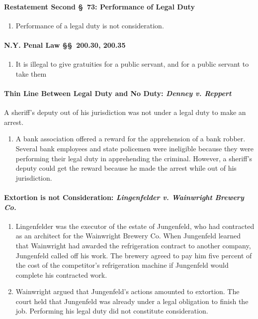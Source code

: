 \paragraph{Restatement Second \S\ 73: Performance of Legal Duty}

\begin{enumerate}
    \item Performance of a legal duty is not consideration.
\end{enumerate}

\paragraph{N.Y. Penal Law \S\S\ 200.30, 200.35}

\begin{enumerate}
    \item It is illegal to give gratuities for a public servant, and for a 
    public servant to take them
\end{enumerate}

\paragraph{Thin Line Between Legal Duty and No Duty: \emph{Denney v. Reppert}}

A sheriff's deputy out of his jurisdiction was not under a legal duty to make 
an arrest.

\begin{enumerate}
    \item A bank association offered a reward for the apprehension of a bank 
    robber. Several bank employees and state policemen were ineligible because 
    they were performing their legal duty in apprehending the criminal. 
    However, a sheriff's deputy could get the reward because he made the 
    arrest while out of his jurisdiction.
\end{enumerate}

\paragraph{Extortion is not Consideration: \emph{Lingenfelder v. Wainwright 
Brewery Co.}}

\begin{enumerate}
    \item Lingenfelder was the executor of the estate of Jungenfeld, who had 
    contracted as an architect for the Wainwright Brewery Co. When Jungenfeld 
    learned that Wainwright had awarded the refrigeration contract to another 
    company, Jungenfeld called off his work. The brewery agreed to pay him 
    five percent of the cost of the competitor's refrigeration machine if 
    Jungenfeld would complete his contracted work.
    \item Wainwright argued that Jungenfeld's actions amounted to extortion. 
    The court held that Jungenfeld was already under a legal obligation to 
    finish the job. Performing his legal duty did not constitute 
    consideration.
\end{enumerate}

